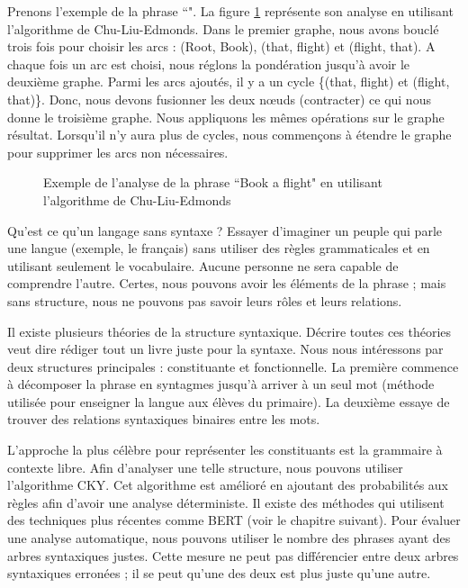 \documentclass{KodeBook}
\begin{document}
Prenons l'exemple de la phrase ``".
La figure \ref{fig:cke-exp} représente son analyse en utilisant l'algorithme de Chu-Liu-Edmonds. 
Dans le premier graphe, nous avons bouclé trois fois pour choisir les arcs : (Root, Book), (that, flight) et (flight, that). 
A chaque fois un arc est choisi, nous réglons la pondération jusqu'à avoir le deuxième graphe.
Parmi les arcs ajoutés, il y a un cycle \{(that, flight) et (flight, that)\}.
Donc, nous devons fusionner les deux nœuds (contracter) ce qui nous donne le troisième graphe.
Nous appliquons les mêmes opérations sur le graphe résultat.
Lorsqu'il n'y aura plus de cycles, nous commençons à étendre le graphe pour supprimer les arcs non nécessaires. 

\begin{figure}[ht]
	\centering
	\caption[Exemple de l'analyse Chu-Liu-Edmonds]{Exemple de l'analyse de la phrase ``Book a flight" en utilisant l'algorithme de Chu-Liu-Edmonds \cite{2019-jurafsky-martin}}
	\label{fig:cke-exp}
\end{figure}

Qu'est ce qu'un langage sans syntaxe ?
Essayer d'imaginer un peuple qui parle une langue (exemple, le français) sans utiliser des règles grammaticales et en utilisant seulement le vocabulaire. 
Aucune personne ne sera capable de comprendre l'autre. 
Certes, nous pouvons avoir les éléments de la phrase ; mais sans structure, nous ne pouvons pas savoir leurs rôles et leurs relations. 

Il existe plusieurs théories de la structure syntaxique. 
Décrire toutes ces théories veut dire rédiger tout un livre juste pour la syntaxe. 
Nous nous intéressons par deux structures principales : constituante et fonctionnelle.
La première commence à décomposer la phrase en syntagmes jusqu'à arriver à un seul mot (méthode utilisée pour enseigner la langue aux élèves du primaire). 
La deuxième essaye de trouver des relations syntaxiques binaires entre les mots.

L'approche la plus célèbre pour représenter les constituants est la grammaire à contexte libre. 
Afin d'analyser une telle structure, nous pouvons utiliser l'algorithme CKY. 
Cet algorithme est amélioré en ajoutant des probabilités aux règles afin d'avoir une analyse déterministe. 
Il existe des méthodes qui utilisent des techniques plus récentes comme BERT (voir le chapitre suivant). 
Pour évaluer une analyse automatique, nous pouvons utiliser le nombre des phrases ayant des arbres syntaxiques justes. 
Cette mesure ne peut pas différencier entre deux arbres syntaxiques erronées ; il se peut qu'une des deux est plus juste qu'une autre. 
\end{document}
